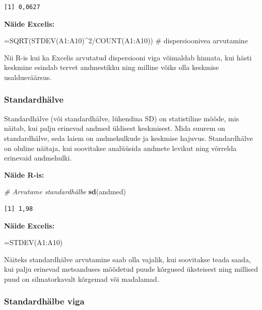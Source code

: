 \documentclass[
]{book}
\newenvironment{Shaded}{\begin{snugshade}}{\end{snugshade}}
\newcommand{\CommentTok}[1]{\textcolor[rgb]{0.56,0.35,0.01}{\textit{#1}}}
\newcommand{\FunctionTok}[1]{\textcolor[rgb]{0.13,0.29,0.53}{\textbf{#1}}}
\newcommand{\NormalTok}[1]{#1}
\renewenvironment{Shaded} {\begin{snugshade}\footnotesize} {\end{snugshade}}
\begin{document}
\begin{verbatim}
[1] 0,0627
\end{verbatim}

\textbf{Näide Excelis:}

\begin{Shaded}
\begin{Highlighting}[]
\NormalTok{=SQRT(STDEV(A1:A10)\^{}2/COUNT(A1:A10)) \# dispersioonivea arvutamine}
\end{Highlighting}
\end{Shaded}

Nii R-is kui ka Excelis arvutatud dispersiooni viga võimaldab hinnata, kui hästi keskmine esindab tervet andmestikku ning milline võiks olla keskmise usaldusväärsus.

\subsubsection{Standardhälve}\label{standardhuxe4lve}

Standardhälve (või standardhälve, lühendina SD) on statistiline mõõde, mis näitab, kui palju erinevad andmed üldisest keskmisest. Mida suurem on standardhälve, seda laiem on andmehulkude ja keskmise hajuvus. Standardhälve on oluline näitaja, kui soovitakse analüüsida andmete levikut ning võrrelda erinevaid andmehulki.

\textbf{Näide R-is:}

\begin{Shaded}
\begin{Highlighting}[]
\CommentTok{\# Arvutame standardhälbe}
\FunctionTok{sd}\NormalTok{(andmed)}
\end{Highlighting}
\end{Shaded}

\begin{verbatim}
[1] 1,98
\end{verbatim}

\textbf{Näide Excelis:}

\begin{Shaded}
\begin{Highlighting}[]
\NormalTok{=STDEV(A1:A10)}
\end{Highlighting}
\end{Shaded}

Näiteks standardhälve arvutamine saab olla vajalik, kui soovitakse teada saada, kui palju erinevad metsanduses mõõdetud puude kõrgused üksteisest ning millised puud on silmatorkavalt kõrgemad või madalamad.

\subsubsection{Standardhälbe viga}\label{standardhuxe4lbe-viga}
\end{document}
